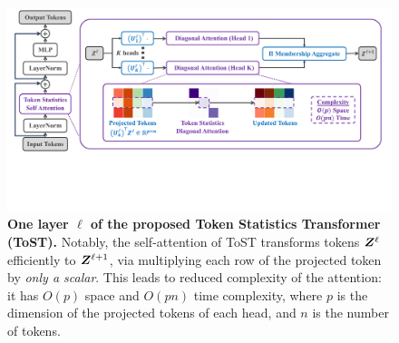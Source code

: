 \documentclass[../../book-main.tex]{subfiles}
\begin{document}
\begin{figure}[t]
    \centering \includegraphics[width=1\textwidth,trim={0 5.0cm 0 0},clip]{figs_chap4/V-CRATE.pdf}
    \vspace{-1mm}
    \caption{\small \textbf{One layer $\ell$ of the proposed Token Statistics Transformer (ToST).} Notably, the self-attention of ToST transforms tokens $\bm{Z}^{\ell}$ efficiently to $\bm{Z}^{\ell+1}$, via multiplying each row of the projected token by \textit{only a scalar}. This leads to reduced complexity of the attention: it has $O(p)$ space and $O(pn)$ time complexity, where $p$ is the dimension of the projected tokens of each head, and $n$ is the number of tokens.
    }
    \label{fig:vcrate-architecture}
\end{figure}
\end{document}
